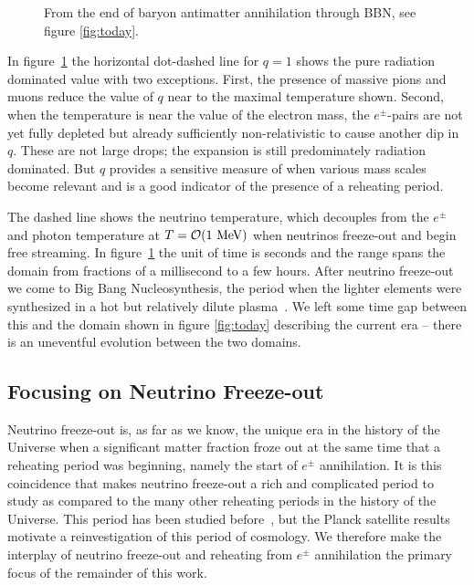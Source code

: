 \begin{figure}
\begin{minipage}{\linewidth}
\caption{From the end of baryon antimatter annihilation through BBN, see figure \ref{fig:today}.%
\label{fig:BBN} }
\end{minipage}
\end{figure}

 In figure~\ref{fig:BBN} the horizontal dot-dashed line for $q=1$ shows the pure radiation dominated value with two exceptions. First, the presence of massive pions and muons reduce the value of $q$ near to the maximal temperature shown. Second, when the temperature is near the value of the electron mass, the $e^\pm$-pairs are not yet fully depleted but already sufficiently non-relativistic to cause another dip in $q$. These are not large drops; the expansion is still predominately radiation dominated. But $q$ provides a sensitive measure of when various mass scales become relevant and is a good indicator of the presence of a reheating period.

 The dashed line shows the neutrino temperature, which decouples from the $e^\pm$ and photon temperature at $T={\cal O}(1\MeV)$ when neutrinos freeze-out and begin free streaming. In figure~\ref{fig:BBN} the unit of time is seconds and the range spans the domain from fractions of a millisecond to a few hours. After neutrino freeze-out we come to Big Bang Nucleosynthesis, the period when the lighter elements were synthesized in a hot but relatively dilute plasma~\cite{Iocco:2008va}. We left some time gap between this and the domain shown in figure \ref{fig:today} describing the current era -- there is an uneventful evolution between the two domains. 

\subsection{Focusing on Neutrino Freeze-out}
Neutrino freeze-out is, as far as we know, the unique era in the history of the Universe when a significant matter fraction froze out at the same time that a reheating period was beginning, namely the start of $e^\pm$ annihilation. It is this coincidence that makes neutrino freeze-out a rich and complicated period to study as compared to the many other reheating periods in the history of the Universe. This period has been studied before~\cite{Madsen,Dolgov_Hansen,Gnedin,Esposito2000,Mangano2002,Mangano2005}, but the Planck satellite results~\cite{Planck} motivate a reinvestigation of this period of cosmology. We therefore make the interplay of neutrino freeze-out and reheating from $e^\pm$ annihilation the primary focus of the remainder of this work.
